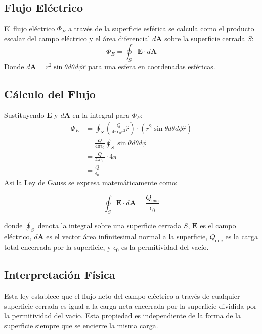 \documentclass{article}
\begin{document}
	\subsection{Flujo Eléctrico}
	El flujo eléctrico \( \Phi_E \) a través de la superficie esférica se calcula como el producto escalar del campo eléctrico y el área diferencial \( d\mathbf{A} \) sobre la superficie cerrada \( S \):
	\begin{equation}
		\Phi_E = \oint_S \mathbf{E} \cdot d\mathbf{A}
	\end{equation}
	Donde \( d\mathbf{A} = r^2 \sin\theta d\theta d\phi \hat{r} \) para una esfera en coordenadas esféricas.
	
	\subsection{Cálculo del Flujo}
	Sustituyendo \( \mathbf{E} \) y \( d\mathbf{A} \) en la integral para \( \Phi_E \):
	\begin{align}
		\Phi_E & = \oint_S \left( \frac{Q}{4\pi \epsilon_0 r^2} \hat{r} \right) \cdot (r^2 \sin\theta d\theta d\phi \hat{r}) \\
		& = \frac{Q}{4\pi \epsilon_0} \oint_S \sin\theta d\theta d\phi                                                \\
		& = \frac{Q}{4\pi \epsilon_0} \cdot 4\pi                                                                      \\
		& = \frac{Q}{\epsilon_0}
	\end{align}
	Asi la Ley de Gauss se expresa matemáticamente como:
	
	\begin{equation}
		\oint_S \mathbf{E} \cdot d\mathbf{A} = \frac{Q_{\text{enc}}}{\epsilon_0}
	\end{equation}
	
	donde $\oint_S$ denota la integral sobre una superficie cerrada $S$, $\mathbf{E}$ es el campo eléctrico, $d\mathbf{A}$ es el vector área infinitesimal normal a la superficie, $Q_{\text{enc}}$ es la carga total encerrada por la superficie, y $\epsilon_0$ es la permitividad del vacío.
	
	\subsection{Interpretación Física}
	
	Esta ley establece que el flujo neto del campo eléctrico a través de cualquier superficie cerrada es igual a la carga neta encerrada por la superficie dividida por la permitividad del vacío. Esta propiedad es independiente de la forma de la superficie siempre que se encierre la misma carga.
	
\end{document}
